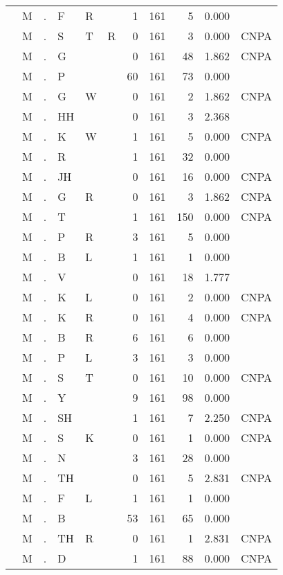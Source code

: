 \begin{longtable}{r@{ } r@{ } c@{ } l@{ } l@{ } l@{ } r r r r l }
 & M & . & F & R &  & 1 & 161 & 5 & 0.000 &  \\
 & M & . & S & T & R & 0 & 161 & 3 & 0.000 & \textsc{CNPA} \\
 & M & . & G &  &  & 0 & 161 & 48 & 1.862 & \textsc{CNPA} \\
 & M & . & P &  &  & 60 & 161 & 73 & 0.000 &  \\
 & M & . & G & W &  & 0 & 161 & 2 & 1.862 & \textsc{CNPA} \\
 & M & . & HH &  &  & 0 & 161 & 3 & 2.368 &  \\
 & M & . & K & W &  & 1 & 161 & 5 & 0.000 & \textsc{CNPA} \\
 & M & . & R &  &  & 1 & 161 & 32 & 0.000 &  \\
 & M & . & JH &  &  & 0 & 161 & 16 & 0.000 & \textsc{CNPA} \\
 & M & . & G & R &  & 0 & 161 & 3 & 1.862 & \textsc{CNPA} \\
 & M & . & T &  &  & 1 & 161 & 150 & 0.000 & \textsc{CNPA} \\
 & M & . & P & R &  & 3 & 161 & 5 & 0.000 &  \\
 & M & . & B & L &  & 1 & 161 & 1 & 0.000 &  \\
 & M & . & V &  &  & 0 & 161 & 18 & 1.777 &  \\
 & M & . & K & L &  & 0 & 161 & 2 & 0.000 & \textsc{CNPA} \\
 & M & . & K & R &  & 0 & 161 & 4 & 0.000 & \textsc{CNPA} \\
 & M & . & B & R &  & 6 & 161 & 6 & 0.000 &  \\
 & M & . & P & L &  & 3 & 161 & 3 & 0.000 &  \\
 & M & . & S & T &  & 0 & 161 & 10 & 0.000 & \textsc{CNPA} \\
 & M & . & Y &  &  & 9 & 161 & 98 & 0.000 &  \\
 & M & . & SH &  &  & 1 & 161 & 7 & 2.250 & \textsc{CNPA} \\
 & M & . & S & K &  & 0 & 161 & 1 & 0.000 & \textsc{CNPA} \\
 & M & . & N &  &  & 3 & 161 & 28 & 0.000 &  \\
 & M & . & TH &  &  & 0 & 161 & 5 & 2.831 & \textsc{CNPA} \\
 & M & . & F & L &  & 1 & 161 & 1 & 0.000 &  \\
 & M & . & B &  &  & 53 & 161 & 65 & 0.000 &  \\
 & M & . & TH & R &  & 0 & 161 & 1 & 2.831 & \textsc{CNPA} \\
 & M & . & D &  &  & 1 & 161 & 88 & 0.000 & \textsc{CNPA} \\

\end{longtable}
